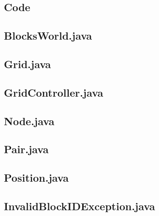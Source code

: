 \documentclass[a4paper]{article}
\begin{document}
\newpage
\begin{appendices}
  \addappheadtotoc

  \section{Code}
  \label{app:code}
  \subsection{BlocksWorld.java}
  \label{app:code-BlocksWorld}
  

  \newpage
  \subsection{Grid.java}
  \label{app:code-Grid}
  

  \newpage
  \subsection{GridController.java}
  \label{app:code-GridController}
  

  \newpage
  \subsection{Node.java}
  \label{app:code-Node}
  

  \newpage
  \subsection{Pair.java}
  \label{app:code-Pair}
  

  \newpage
  \subsection{Position.java}
  \label{app:code-Position}
  

  \newpage
  \subsection{InvalidBlockIDException.java}
  \label{app:code-InvalidBlockIDException}
  


\end{appendices}
\end{document}
